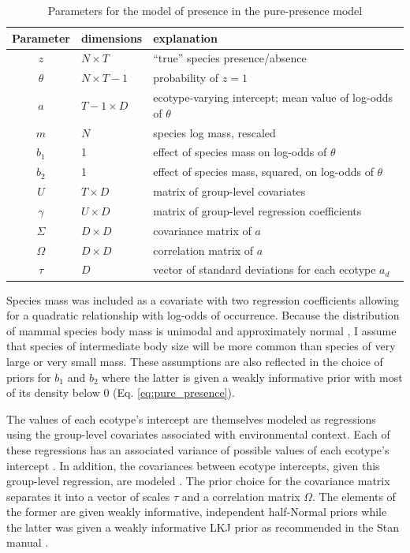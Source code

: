 \begin{table}
  \centering
  \caption{Parameters for the model of presence in the pure-presence model}
  \begin{tabular}{c l l}
    Parameter & dimensions & explanation \\
    \hline
    \(z\) & \(N \times T\) & ``true'' species presence/absence \\
    \(\theta\) & \(N \times T - 1\) & probability of \(z = 1\) \\
    \(a\) & \(T - 1 \times D\) & ecotype-varying intercept; mean value of log-odds of \(\theta\) \\
    \(m\) & \(N\) & species log mass, rescaled \\
    \(b_{1}\) & 1 & effect of species mass on log-odds of \(\theta\) \\
    \(b_{2}\) & 1 & effect of species mass, squared, on log-odds of \(\theta\) \\
    \(U\) & \(T \times D\) & matrix of group-level covariates \\
    \(\gamma\) & \(U \times D\) & matrix of group-level regression coefficients \\
    \(\Sigma\) & \(D \times D\) & covariance matrix of \(a\) \\
    \(\Omega\) & \(D \times D\) & correlation matrix of \(a\) \\
    \(\tau\) & \(D\) & vector of standard deviations for each ecotype \(a_{d}\) \\
  \end{tabular}
  \label{tab:pres_param}
\end{table}

Species mass was included as a covariate with two regression coefficients allowing for a quadratic relationship with log-odds of occurrence. Because the distribution of mammal species body mass is unimodal and approximately normal \citep{Smith2004}, I assume that species of intermediate body size will be more common than species of very large or very small mass. These assumptions are also reflected in the choice of priors for \(b_{1}\) and \(b_{2}\) where the latter is given a weakly informative prior with most of its density below 0 (Eq. \ref{eq:pure_presence}).

The values of each ecotype's intercept are themselves modeled as regressions using the group-level covariates associated with environmental context. Each of these regressions has an associated variance of possible values of each ecotype's intercept \citep{Gelman2007}. In addition, the covariances between ecotype intercepts, given this group-level regression, are modeled \citep{Gelman2007}. The prior choice for the covariance matrix separates it into a vector of scales \(\tau\) and a correlation matrix \(\Omega\). The elements of the former are given weakly informative, independent half-Normal priors while the latter was given a weakly informative LKJ prior as recommended in the Stan manual \citep{StanDevelopmentTeam2016}.

